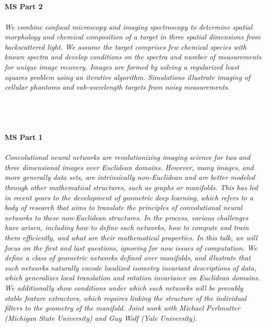 \begin{multicols}{2}
\\ 
    \\
    \\\\
    \noindent\textbf{MS Part 2}\\
\\  
    \textit{We combine confocal microscopy and imaging spectroscopy to determine spatial morphology and chemical composition of a target in three spatial dimensions from backscattered light. We assume the target comprises few chemical species with known spectra and develop conditions on the spectra and number of measurements for unique image recovery. Images are formed by solving a regularized least squares problem using an iterative algorithm. Simulations illustrate imaging of cellular phantoms and sub-wavelength  targets from noisy measurements.}\\
\\ 
    \\
    \\\\
    \noindent\textbf{MS Part 1}\\
\\  
    \textit{Convolutional neural networks are revolutionizing imaging science for two and three dimensional images over Euclidean domains. However, many images, and more generally data sets, are intrinsically non-Euclidean and are better modeled through other mathematical structures, such as graphs or manifolds. This has led in recent years to the development of geometric deep learning, which refers to a body of research that aims to translate the principles of convolutional neural networks to these non-Euclidean structures. In the process, various challenges have arisen, including how to define such networks, how to compute and train them efficiently, and what are their mathematical properties. In this talk, we will focus on the first and last questions, ignoring for now issues of computation. We define a class of geometric networks defined over manifolds, and illustrate that such networks naturally encode localized isometry invariant descriptions of data, which generalizes local translation and rotation invariance on Euclidean domains. We additionally show conditions under which such networks will be provably stable feature extractors, which requires linking the structure of the individual filters to the geometry of the manifold. Joint work with Michael Perlmutter (Michigan State University) and Guy Wolf (Yale University).}\\

\end{multicols}
